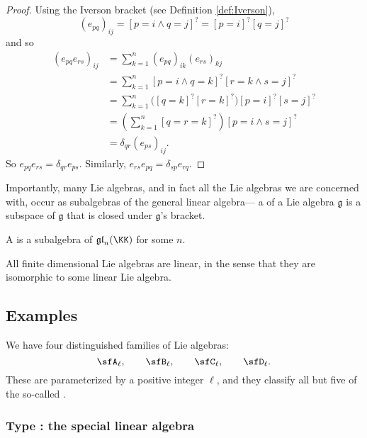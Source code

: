 \documentclass{article}
\newcommand{\iverson}[1]{\ensuremath{\left[{#1}\right]^?}}
\newcommand{\frkg}{{\ensuremath{\mathfrak{g}}}}
\newcommand{\glalg}{\ensuremath{\mathfrak{gl}}}
\begin{document}
\begin{proof}
    Using the Iverson bracket (see Definition \ref{def:Iverson}),
    \[
        (e_{pq})_{ij}
        =
        \iverson{p=i \wedge q=j}
        =
        \iverson{p=i}\iverson{q=j}
    \]
    and so
    \begin{align*}
        (e_{pq}e_{rs})_{ij}
        &=
        \sum_{k=1}^n
        (e_{pq})_{ik}
        (e_{rs})_{kj}
        \\
        &=
        \sum_{k=1}^n
        \iverson{p=i \wedge q=k}
        \iverson{r=k \wedge s=j}
        \\
        &=
        \sum_{k=1}^n
        \Big(
            \iverson{q=k}\iverson{r=k}
        \Big)
        \iverson{p=i}
        \iverson{s=j}
        \\
        &=
        \left(
            \sum_{k=1}^n
            \iverson{q=r=k}
        \right)
        \iverson{p=i \wedge s=j}
        \\
        &=
        \delta_{qr}
        (e_{ps})_{ij}.
    \end{align*}
    So $e_{pq}e_{rs} = \delta_{qr}e_{ps}$. 
    Similarly,
    $e_{rs}e_{pq} = \delta_{sp}e_{rq}$.
\end{proof}

Importantly, many Lie algebras, and in fact all the Lie algebras we are concerned with, occur as subalgebras of the general linear algebra--- a  of a Lie algebra $\frkg$ is a subspace of $\frkg$ that is closed under $\frkg$'s bracket.

\begin{definition}
    A  is a subalgebra of $\glalg_n(\KK)$ for some $n$.
\end{definition}

All finite dimensional Lie algebras are linear, in the sense that they are isomorphic to some linear Lie algebra.

\subsection{Examples}

We have four distinguished families of Lie algebras:
\[
    \sfA_\ell,\qquad
    \sfB_\ell,\qquad
    \sfC_\ell,\qquad
    \sfD_\ell.
\]
These are parameterized by a positive integer $\ell$, and they classify all but five of the so-called .

\subsubsection{Type \sfA: the special linear algebra}
\end{document}
